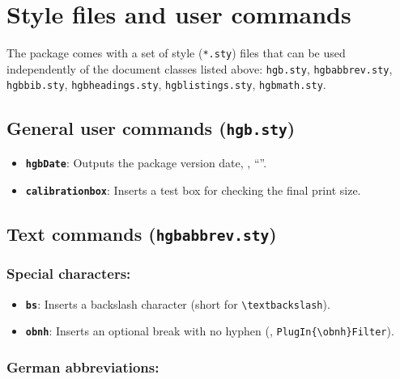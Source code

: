 \documentclass[english]{hgbarticle}
\begin{document}
\section{Style files and user commands}

The package comes with a set of style (\texttt{*.sty}) files that can be used
independently of the document classes listed above:
\texttt{hgb.sty},
\texttt{hgbabbrev.sty},
\texttt{hgbbib.sty},
\texttt{hgbheadings.sty},
\texttt{hgblistings.sty},
\texttt{hgbmath.sty}.


\subsection{General user commands (\texttt{hgb.sty})}


\begin{itemize}
\item \textbf{\texttt{{\bs}hgbDate}}: Outputs the package version date, 
		\eg, ``\texttt{\hgbDate}''.
\item \textbf{\texttt{{\bs}calibrationbox}}: Inserts a test box for checking the final print size.
\end{itemize}



\subsection{Text commands (\texttt{hgbabbrev.sty})}

\subsubsection*{Special characters:}

\begin{itemize}
\item \textbf{\texttt{{\bs}bs}}: Inserts a backslash character (short for \verb!\textbackslash!).
\item \textbf{\texttt{{\bs}obnh}}: Inserts an optional break with no hyphen (\eg, \verb!PlugIn{\obnh}Filter!).
\end{itemize}



\subsubsection*{German abbreviations:}
\end{document}
